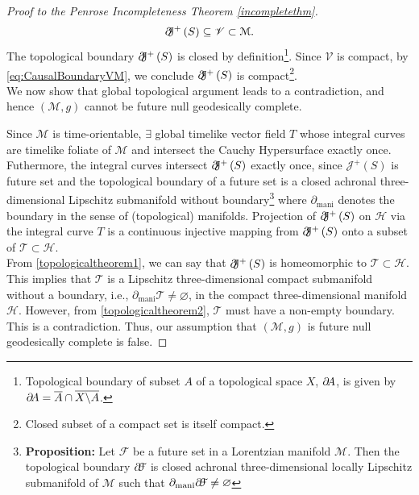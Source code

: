 \documentclass[12pt, a4paper]{report}
\theoremstyle{bfnote}
\begin{document}
\begin{proof}[Proof to the Penrose Incompleteness Theorem \ref{incompletethm}]
\begin{equation}{\label{eq:CausalBoundaryVM}}
    \partial\hspace{-0.3em}\mathcal{J}^+\left(S\right) \subseteq \mathscr{V} \subset \mathcal{M}.
\end{equation}
The topological boundary $\partial\hspace{-0.3em}\mathcal{J}^+\left(S\right)$ is
closed by definition\footnote[3]{Topological boundary of subset $A$ of a
topological space $X$, $\partial\hspace{-0.2em} A$, is given by
$\partial\hspace{-0.2em} A = \overline{A} \cap \overline{X \backslash A}$.}.
Since $\mathscr{V}$ is compact, by \ref{eq:CausalBoundaryVM}, we conclude
$\partial\hspace{-0.3em}\mathcal{J}^+\left(S\right)$ is
compact\footnote[7]{Closed subset of a compact set is itself compact.}.\\
We now show that global topological argument leads to a contradiction, and hence
$\left(\mathcal{M}, g\right)$ cannot be future null geodesically complete.

Since $\mathcal{M}$ is time-orientable, $\exists$ global timelike vector field
$T$ whose integral curves are timelike foliate of $\mathcal{M}$  and intersect
the Cauchy Hypersurface exactly once. Futhermore, the integral curves intersect
$\partial\hspace{-0.3em}\mathcal{J}^+\left(S\right)$ exactly once, since
$\mathcal{J}^+\left(S\right)$ is future set and the topological boundary of a
future set is a closed achronal three-dimensional Lipschitz submanifold without
boundary\footnote[9]{\textbf{Proposition:} Let $\mathcal{F}$ be a future set in
a Lorentzian manifold $\mathcal{M}$. Then the topological boundary
$\partial\hspace{-0.2em}\mathcal{F}$ is closed achronal three-dimensional
locally Lipschitz submanifold of $\mathcal{M}$ such that
$\partial_{\text{mani}}\partial\hspace{-0.2em}\mathcal{F} \neq \varnothing$}
where $\partial_{\text{mani}}$ denotes the boundary in the sense of
(topological) manifolds. Projection of
$\partial\hspace{-0.3em}\mathcal{J}^+\left(S\right)$ on $\mathcal{H}$ via the
integral curve $T$ is a continuous injective mapping from
$\partial\hspace{-0.3em}\mathcal{J}^+\left(S\right)$ onto a subset of
$\mathscr{T}\subset\mathcal{H}$. \\
From \ref{topologicaltheorem1}, we can say that
$\partial\hspace{-0.3em}\mathcal{J}^+\left(S\right)$ is homeomorphic to
$\mathscr{T}\subset\mathcal{H}$. This implies that $\mathscr{T}$ is a Lipschitz
three-dimensional compact submanifold without a boundary, i.e.,
$\partial_\text{mani}\mathscr{T}\neq\varnothing$, in the compact
three-dimensional manifold $\mathcal{H}$. However, from
\ref{topologicaltheorem2}, $\mathscr{T}$ must have a non-empty boundary. This is
a contradiction. Thus, our assumption that $\left(\mathcal{M}, g\right)$ is
future null geodesically complete is false. 
\end{proof}
\end{document}
